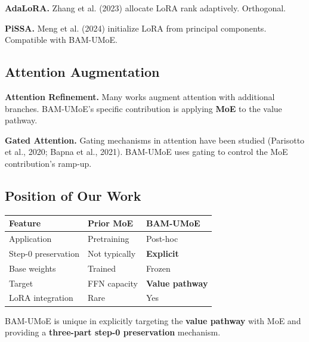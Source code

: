 \textbf{AdaLoRA.} Zhang et al. (2023) allocate LoRA rank adaptively. Orthogonal.

\textbf{PiSSA.} Meng et al. (2024) initialize LoRA from principal components. 
Compatible with BAM-UMoE.

\subsection{Attention Augmentation}

\textbf{Attention Refinement.} Many works augment attention with additional 
branches. BAM-UMoE's specific contribution is applying \textbf{MoE} to the 
value pathway.

\textbf{Gated Attention.} Gating mechanisms in attention have been studied 
(Parisotto et al., 2020; Bapna et al., 2021). BAM-UMoE uses gating to 
control the MoE contribution's ramp-up.

\subsection{Position of Our Work}

\begin{table}[H]
\centering
\small
\begin{tabular}{lll}
\toprule
\textbf{Feature} & \textbf{Prior MoE} & \textbf{BAM-UMoE} \\
\midrule
Application & Pretraining & Post-hoc \\
Step-0 preservation & Not typically & \textbf{Explicit} \\
Base weights & Trained & Frozen \\
Target & FFN capacity & \textbf{Value pathway} \\
LoRA integration & Rare & Yes \\
\bottomrule
\end{tabular}
\end{table}

BAM-UMoE is unique in explicitly targeting the \textbf{value pathway} with MoE 
and providing a \textbf{three-part step-0 preservation} mechanism.